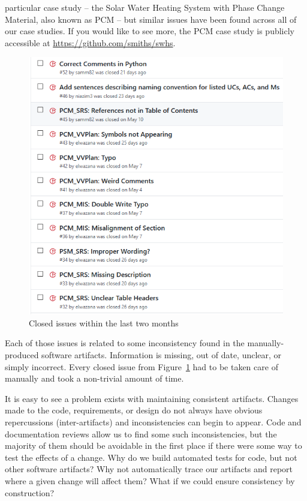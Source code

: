 \documentclass[twocolumn]{article}
\begin{document}
particular case study -- the Solar Water Heating System with Phase Change 
Material, also known as PCM -- but similar issues have been found across all of 
our case studies. If you would like to see more, the PCM case study is publicly 
accessible at \url{https://github.com/smiths/swhs}.
\begin{figure}[!htbp]
  \centering
  \includegraphics[width=\linewidth]{RecentIssuesSWHS.PNG}
  \caption{Closed issues within the last two months}
  \label{Fig:ClosedIssues}
\end{figure}

Each of those issues is related to some inconsistency found in the 
manually-produced software artifacts. Information is missing, out of date, 
unclear, or simply incorrect. Every closed issue from 
Figure~\ref{Fig:ClosedIssues} had to be taken care of manually and took a 
non-trivial amount of time.

It is easy to see a problem exists with maintaining consistent artifacts. 
Changes made to the code, requirements, or design do not always have obvious 
repercussions (inter-artifacts) and inconsistencies can begin to appear. Code 
and documentation reviews allow us to find some such inconsistencies, but the 
majority of them should be avoidable in the first place if there were some way 
to test the effects of a change. Why do we build automated tests for code, but 
not other software artifacts? Why not automatically trace our 
artifacts and report where a given change will affect them? What if we could 
ensure consistency by construction?
\end{document}
